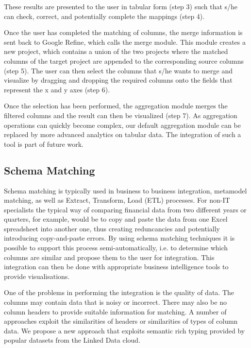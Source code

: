 These results are presented to the user in tabular form (step 3) such that s/he can check, correct, and potentially complete the mappings (step 4).

Once the user has completed the matching of columns, the merge information is sent back to Google Refine, which calls the merge module. This module creates a new project, which contains a union of the two projects where the matched columns of the target project are appended to the corresponding source columns (step 5). The user can then select the columns that s/he wants to merge and visualize by dragging and dropping the required columns onto the fields that represent the x and y axes (step 6).

Once the selection has been performed, the aggregation module merges the filtered columns and the result can then be visualized (step 7). As aggregation operations can quickly become complex, our default aggregation module can be replaced by more advanced analytics on tabular data. The integration of such a tool is part of future work.

\subsection{Schema Matching }
Schema matching is typically used in business to business integration, metamodel matching, as well as Extract, Transform, Load (ETL) processes. For non-IT specialists the typical way of comparing financial data from two different years or quarters, for example, would be to copy and paste the data from one Excel spreadsheet into another one, thus creating reduncancies and potentially introducing copy-and-paste errors. By using schema matching techniques it is possible to support this process semi-automatically, i.e. to determine which columns are similar and propose them to the user for integration. This integration can then be done with appropriate business intelligence tools to provide visualisations.

One of the problems in performing the integration is the quality of data. The columns may contain data that is noisy or incorrect. There may also be no column headers to provide suitable information for matching. A number of approaches exploit the similarities of headers or similarities of types of column data. We propose a new approach that exploits semantic rich typing provided by popular datasets from the Linked Data cloud.



